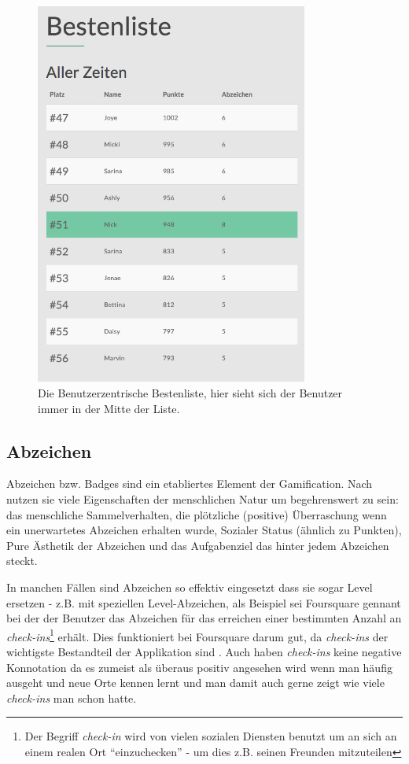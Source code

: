 \documentclass[12pt,twoside]{book}
\begin{document}
\begin{figure}[htbp]
    \centering
    \includegraphics[width=0.8\textwidth]{images/infoboard_leaderboard_user.png}
    \caption{Die Benutzerzentrische Bestenliste, hier sieht sich der Benutzer immer in der Mitte der Liste.}
    \label{fig:leaderboarduser}
\end{figure}

\subsection{Abzeichen}
Abzeichen bzw. Badges sind ein etabliertes Element der Gamification. Nach \citep{zichermann2011gamification, 55} nutzen sie viele Eigenschaften der menschlichen Natur um begehrenswert zu sein: das menschliche Sammelverhalten, die plötzliche (positive) Überraschung wenn ein unerwartetes Abzeichen erhalten wurde, Sozialer Status (ähnlich zu Punkten), Pure Ästhetik der Abzeichen und das Aufgabenziel das hinter jedem Abzeichen steckt.

In manchen Fällen sind Abzeichen so effektiv eingesetzt dass sie sogar Level ersetzen - z.B. mit speziellen Level-Abzeichen, als Beispiel sei Foursquare gennant bei der der Benutzer das Abzeichen für das erreichen einer bestimmten Anzahl an \textit{check-ins}\footnote{Der Begriff \textit{check-in} wird von vielen sozialen Diensten benutzt um an sich an einem realen Ort ``einzuchecken'' - um dies z.B. seinen Freunden mitzuteilen} erhält. Dies funktioniert bei Foursquare darum gut, da \textit{check-ins} der wichtigste Bestandteil der Applikation sind \citep{zichermann2011gamification, 57}. Auch haben \textit{check-ins} keine negative Konnotation da es zumeist als überaus positiv angesehen wird wenn man häufig ausgeht und neue Orte kennen lernt und man damit auch gerne zeigt wie viele \textit{check-ins} man schon hatte.
\end{document}
